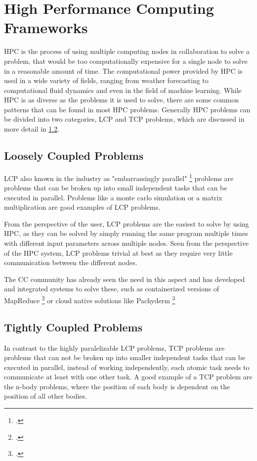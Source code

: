 \section{High Performance Computing Frameworks}

\ac{HPC} is the process of using multiple computing nodes in collaboration to solve a problem, that would be too computationally expensive for a single node to solve in a reasonable amount of time.
The computational power provided by \ac{HPC} is used in a wide variety of fields, ranging from weather forecasting to computational fluid dynamics and even in the field of machine learning.
While \ac{HPC} is as diverse as the problems it is used to solve, there are some common patterns that can be found in most \ac{HPC} problems.
Generally \ac{HPC} problems can be divided into two categories, \ac{LCP} and \ac{TCP} problems, which are discussed in more detail in \ref{state_of_the_art_tcp}.


\subsection{Loosely Coupled Problems}

\ac{LCP} also known in the industry as "embarrassingly parallel" \footcite{brownEngineeringBeowulfstyleCompute2004} problems are problems that can be broken up into small independent tasks that can be executed in parallel.
Problems like a monte carlo simulation or a matrix multiplication are good examples of \ac{LCP} problems.

From the perspective of the user, \ac{LCP} problems are the easiest to solve by using \ac{HPC}, as they can be solved by simply running the same program multiple times with different input parameters across multiple nodes.
Seen from the perspective of the \ac{HPC} system, \ac{LCP} problems trivial at best as they require very little communication between the different nodes.

The \ac{CC} community has already seen the need in this aspect and has developed and integrated systems to solve these,
such as containerized versions of MapReduce \footcite{camacho-rodriguezApacheHiveMapReduce2019} or cloud native solutions like Pachyderm \footcite{HomePagePachyderm}


\subsection{Tightly Coupled Problems}
\label{state_of_the_art_tcp}
In contrast to the highly paralelizable  \ac{LCP} problems, \ac{TCP} problems are problems that can not be broken up into smaller independent tasks that can be executed in parallel,
instead of working independently, each atomic task needs to communicate at least with one other task.
A good example of a \ac{TCP} problem are the n-body problems, where the position of each body is dependent on the position of all other bodies.

